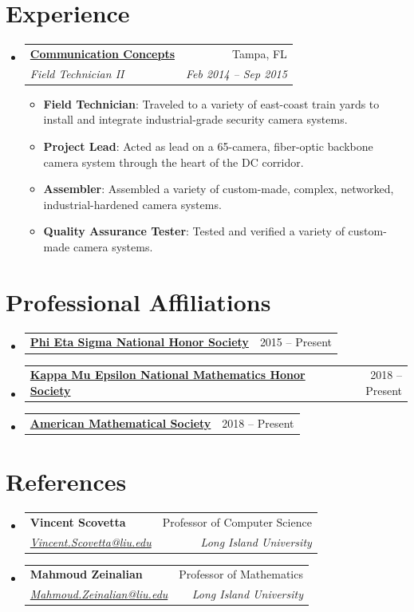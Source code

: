 \documentclass[letterpaper,11pt]{article}
\makeatletter
\newcommand{\OneRowSubheading}[2]{
	\item\vspace{-5pt}
		\begin{tabular*}{.97\textwidth}{l @{\extracolsep{\fill}} r}
			\textbf{#1} & #2
		\end{tabular*}\vspace{-5pt}
}
\newcommand{\TwoRowSubheading}[4]{
	\item\vspace{-5pt}
		\begin{tabular*}{.97\textwidth}{l @{\extracolsep{\fill}} r}
			\textbf{#1} & #2 \\
			\textit{\small #3} & \textit{\small #4} \\
		\end{tabular*}\vspace{-5pt}
}
\newcommand{\ListItem}[2]{
	\item\small
		\textbf{#1}{: #2 \vspace{-2.5pt}}
}
\makeatother
\begin{document}
	
	
\section{Experience}
	\begin{itemize}[leftmargin=*]
		\TwoRowSubheading
			{\href{http://comconcepts.com}{Communication Concepts}}{Tampa, FL}
			{Field Technician II}{Feb 2014 -- Sep 2015}
		\begin{itemize}
			\ListItem{Field Technician}
				{Traveled to a variety of east-coast train yards to install and integrate industrial-grade security camera systems.}
			\ListItem{Project Lead}
				{Acted as lead on a 65-camera, fiber-optic backbone camera system through the heart of the DC corridor.}
	  		\ListItem{Assembler}
				{Assembled a variety of custom-made, complex, networked, industrial-hardened camera systems.}
			\ListItem{Quality Assurance Tester}
				{Tested and verified a variety of custom-made camera systems.}
		\end{itemize}
	\end{itemize}


	
\section{Professional Affiliations}
	\begin{itemize}[leftmargin=*]
		\OneRowSubheading
			{\href{http://phietasigma.org/}{Phi Eta Sigma National Honor Society}}{2015 -- Present}
		\OneRowSubheading
			{\href{http://kappamuepsilon.org}{Kappa Mu Epsilon National Mathematics Honor Society}}{2018 -- Present}
		\OneRowSubheading
			{\href{http://ams.org}{American Mathematical Society}}{2018 -- Present}
	\end{itemize}



\section{References}
	\begin{itemize}[leftmargin=*]
		\TwoRowSubheading
			{Vincent Scovetta}{Professor of Computer Science}
			{\href{mailto:Vincent.Scovetta@liu.edu}{Vincent.Scovetta@liu.edu}}{Long Island University}
		\TwoRowSubheading
			{Mahmoud Zeinalian}{Professor of Mathematics}
			{\href{mailto:Mahmoud.Zeinalian@liu.edu}{Mahmoud.Zeinalian@liu.edu}}{Long Island University}
	\end{itemize}
	
	
	
\end{document}
